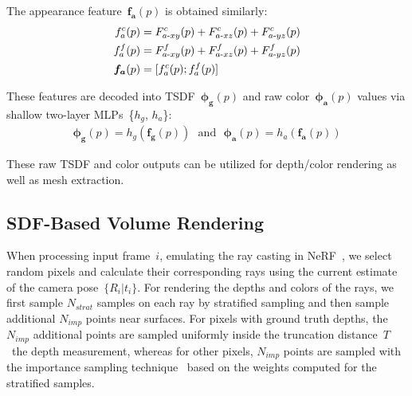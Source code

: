 The appearance feature~$\boldsymbol{f_{a}}(p)$ is obtained similarly:
\begin{align}
	f^{c}_{a}(p) &= F^{c}_{a\text{-}xy}(p) + F^{c}_{a\text{-}xz}(p) + F^{c}_{a\text{-}yz}(p) \notag \\
	f^{f}_{a}(p) &= F^{f}_{a\text{-}xy}(p) + F^{f}_{a\text{-}xz}(p) + F^{f}_{a\text{-}yz}(p) \notag \\
	\boldsymbol{f_{a}}(p) &= [f^{c}_{a}(p) ; f^{f}_{a}(p)]
\end{align}

These features are decoded into TSDF~$\boldsymbol{\phi_{g}}(p)$ and raw color~$\boldsymbol{\phi_{a}}(p)$ values via shallow two-layer MLPs~\{$h_{g}$, $h_{a}$\}:
\begin{align}
	\boldsymbol{\phi_{g}}(p) = h_{g}\left(\boldsymbol{f_{g}}(p)\right) \text{~~and~~} \boldsymbol{\phi_{a}}(p) = h_{a}\left(\boldsymbol{f_{a}}(p)\right)
\end{align}

These raw TSDF and color outputs can be utilized for depth/color rendering as well as mesh extraction.

\subsection{SDF-Based Volume Rendering} \label{sec:c4_rendering}

When processing input frame~$i$, emulating the ray casting in NeRF~\citep{mildenhall2020nerf}, we select random pixels and calculate their corresponding rays using the current estimate of the camera pose~$\{R_{i}| t_{i}\}$. For rendering the depths and colors of the rays, we first sample $N_{strat}$ samples on each ray by stratified sampling and then sample additional $N_{imp}$ points near surfaces. For pixels with ground truth depths, the $N_{imp}$ additional points are sampled uniformly inside the truncation distance~$T$ \wrt~the depth measurement, whereas for other pixels, $N_{imp}$ points are sampled with the importance sampling technique~\citep{mildenhall2020nerf, martin2021nerf, wang2022go, sucar2021imap} based on the weights computed for the stratified samples.

